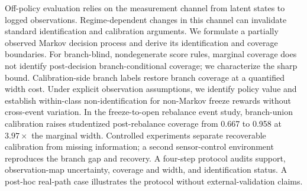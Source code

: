 Off-policy evaluation relies on the measurement channel from latent states to logged observations. Regime-dependent changes in this channel can invalidate standard identification and calibration arguments. We formulate a partially observed Markov decision process and derive its identification and coverage boundaries. For branch-blind, nondegenerate score rules, marginal coverage does not identify post-decision branch-conditional coverage; we characterize the sharp bound. Calibration-side branch labels restore branch coverage at a quantified width cost. Under explicit observation assumptions, we identify policy value and establish within-class non-identification for non-Markov freeze rewards without cross-event variation. In the freeze-to-open rebalance event study, branch-union calibration raises studentized post-rebalance coverage from 0.667 to 0.958 at $3.97\times$ the marginal width. Controlled experiments separate recoverable calibration from missing information; a second sensor-control environment reproduces the branch gap and recovery. A four-step protocol audits support, observation-map uncertainty, coverage and width, and identification status. A post-hoc real-path case illustrates the protocol without external-validation claims.
